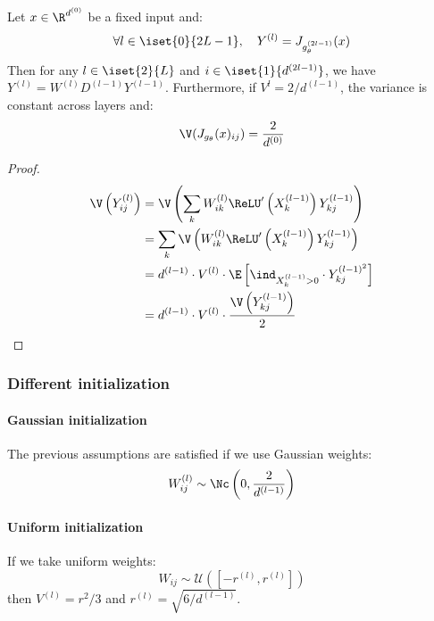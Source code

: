 \begin{property}
    Let $x\in\R^{d^{(0)}}$ be a fixed input and:
    \begin{equation}
        \forall l\in\iset{0}{2L-1}, \quad Y^{(l)}=J_{g_\theta^{(2l-1)}}(x)
    \end{equation}
    Then for any $l\in\iset{2}{L}$ and $i\in\iset{1}{d^{(2l-1)}}$, we have $Y^{(l)} = W^{(l)}D^{(l-1)}Y^{(l-1)}$. Furthermore, if $V^{l}=2/d^{(l-1)}$, the variance is constant across layers and:
    \begin{equation*}
        \V(J_{g_\theta}(x)_{ij}) = \frac{2}{d^{(0)}}
    \end{equation*}
\end{property}
\begin{proof}
    \begin{equation*}
        \begin{aligned}
            \V\left(Y_{ij}^{(l)}\right) &= \V\left(\sum_kW_{ik}^{(l)}\ReLU'\left(X_k^{(l-1)}\right) Y_{kj}^{(l-1)}\right)\\
            &= \sum_k \V\left(W_{ik}^{(l)} \ReLU'\left(X_k^{(l-1)}\right) Y_{kj}^{(l-1)}\right)\\
            &= d^{(l-1)} \cdot V^{(l)}\cdot \E\left[\ind_{X_k^{(l-1)}>0}\cdot Y_{kj}^{(l-1)^2}\right]\\
            &= d^{(l-1)} \cdot V^{(l)}\cdot \frac{\V\left(Y_{kj}^{(l-1)}\right)}{2}\\
        \end{aligned}
    \end{equation*}
\end{proof}

\subsubsection{Different initialization}
\paragraph*{Gaussian initialization} The previous assumptions are satisfied if we use Gaussian weights:
\begin{equation*}
    W_{ij}^{(l)} \sim \Nc\left(0, \frac{2}{d^{(l-1)}}\right)
\end{equation*}

\paragraph*{Uniform initialization}
If we take uniform weights:
\begin{equation*}
    W_{ij} \sim \mathcal{U}([-r^{(l)}, r^{(l)}])
\end{equation*}
then $V^{(l)}=r^2/3$ and $r^{(l)}=\sqrt{6/d^{(l-1)}}$.

